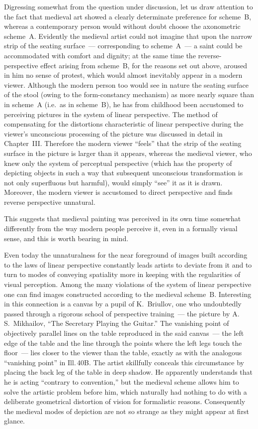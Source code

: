 
Digressing somewhat from the question under discussion, let us draw attention to the
fact that medieval art showed a clearly determinate preference for scheme~B, whereas
a contemporary person would without doubt choose the axonometric scheme~A.  Evidently
the medieval artist could not imagine that upon the narrow strip of the seating
surface~--- corresponding to scheme~A~--- a saint could be accommodated with comfort
and dignity; at the same time the reverse-perspective effect arising from scheme~B,
for the reasons set out above, aroused in him no sense of protest, which would almost
inevitably appear in a modern viewer.  Although the modern person too would see in
nature the seating surface of the stool (owing to the form-constancy mechanism) as
more nearly square than in scheme~A (i.e.\ as in scheme~B), he has from childhood
been accustomed to perceiving pictures in the system of linear perspective.  The
method of compensating for the distortions characteristic of linear perspective
during the viewer's unconscious processing of the picture was discussed in detail in
Chapter~III.  Therefore the modern viewer ``feels'' that the strip of the seating
surface in the picture is larger than it appears, whereas the medieval viewer, who
knew only the system of perceptual perspective (which has the property of depicting
objects in such a way that subsequent unconscious transformation is not only
superfluous but harmful), would simply ``see'' it as it is drawn.  Moreover, the
modern viewer is accustomed to direct perspective and finds reverse perspective
unnatural.

This suggests that medieval painting was perceived in its own time somewhat
differently from the way modern people perceive it, even in a formally visual sense,
and this is worth bearing in mind.

Even today the unnaturalness for the near foreground of images built according to the
laws of linear perspective constantly leads artists to deviate from it and to turn to
modes of conveying spatiality more in keeping with the regularities of visual
perception.  Among the many violations of the system of linear perspective one can
find images constructed according to the medieval scheme~B.  Interesting in this
connection is a canvas by a pupil of K.~Briullov, one who undoubtedly passed through
a rigorous school of perspective training~--- the picture by A.\,S.~Mikhailov, ``The
Secretary Playing the Guitar.''  The vanishing point of objectively parallel lines on
the table reproduced in the said canvas~--- the left edge of the table and the line
through the points where the left legs touch the floor~--- lies closer to the viewer
than the table, exactly as with the analogous ``vanishing point'' in Ill.\,40B.  The
artist skillfully conceals this circumstance by placing the back leg of the table in
deep shadow.  He apparently understands that he is acting ``contrary to convention,''
but the medieval scheme allows him to solve the artistic problem before him, which
naturally had nothing to do with a deliberate geometrical distortion of vision for
formalistic reasons.  Consequently the medieval modes of depiction are not so strange
as they might appear at first glance.

